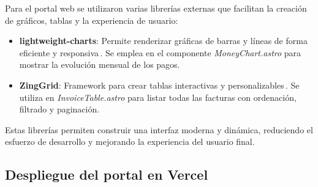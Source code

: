 \begin{large}

Para el portal web se utilizaron varias librerías externas que facilitan la creación de gráficos, tablas y la experiencia de usuario:

\begin{itemize}
\item \textbf{lightweight-charts}: Permite renderizar gráficas de barras y líneas de forma eficiente y responsiva\,\cite{lightweight_charts}. Se emplea en el componente \textit{MoneyChart.astro} para mostrar la evolución mensual de los pagos.
\item \textbf{ZingGrid}: Framework para crear tablas interactivas y personalizables\,\cite{zinggrid}. Se utiliza en \textit{InvoiceTable.astro} para listar todas las facturas con ordenación, filtrado y paginación.
\end{itemize}

Estas librerías permiten construir una interfaz moderna y dinámica, reduciendo el esfuerzo de desarrollo y mejorando la experiencia del usuario final.

\end{large}

\subsection{Despliegue del portal en Vercel}

